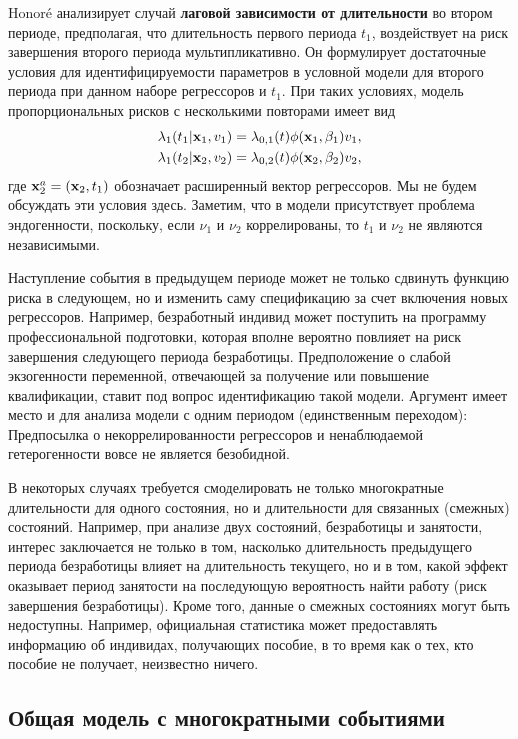 Honor\'e анализирует случай \textbf{лаговой зависимости от длительности} во втором периоде, предполагая, что длительность первого периода $t_1$, воздействует на риск завершения второго периода мультипликативно. Он формулирует достаточные условия для идентифицируемости параметров в условной модели для второго периода при данном наборе регрессоров и $t_1$. При таких условиях, модель пропорциональных рисков с несколькими повторами имеет вид
        \begin{align}\label{eq:19.25}
        \lambda_1(t_1|\mathbf{x}_1,v_1) &= \lambda_{0,1}(t) \phi(\mathbf{x}_1,\beta_1)v_1, \\
        \lambda_1(t_2|\mathbf{x}_2,v_2) &= \lambda_{0,2}(t) \phi(\mathbf{x}_2,\beta_2)v_2, \notag
        \end{align}
где $\mathbf{x}^{a}_{2} = (\mathbf{x}_2, t_1)$ обозначает расширенный вектор регрессоров. Мы не будем обсуждать эти условия здесь. Заметим, что в модели присутствует проблема эндогенности, поскольку, если $\nu_1$ и $\nu_2$ коррелированы, то $t_1$ и $\nu_2$ не являются независимыми.

Наступление события в предыдущем периоде может не только сдвинуть функцию риска в следующем, но и изменить саму спецификацию за счет включения новых регрессоров. Например, безработный индивид может поступить на программу профессиональной подготовки, которая вполне вероятно повлияет на риск завершения следующего периода безработицы. Предположение о слабой экзогенности переменной, отвечающей за получение или повышение квалификации, ставит под вопрос идентификацию такой модели. Аргумент имеет место и для анализа модели с одним периодом (единственным переходом): Предпосылка о некоррелированности регрессоров и ненаблюдаемой гетерогенности вовсе не является безобидной.

В некоторых случаях требуется смоделировать не только многократные длительности для одного состояния, но и длительности для связанных (смежных) состояний. Например, при анализе двух состояний, безработицы и занятости, интерес заключается не только в том, насколько длительность предыдущего периода безработицы влияет на длительность текущего, но и в том, какой эффект оказывает период занятости на последующую вероятность найти работу (риск завершения безработицы). Кроме того, данные о смежных состояниях могут быть недоступны. Например, официальная статистика может предоставлять информацию об индивидах, получающих пособие, в то время как о тех, кто пособие не получает, неизвестно ничего.




\subsection{Общая модель с многократными событиями}\label{sec:19.4.2}

